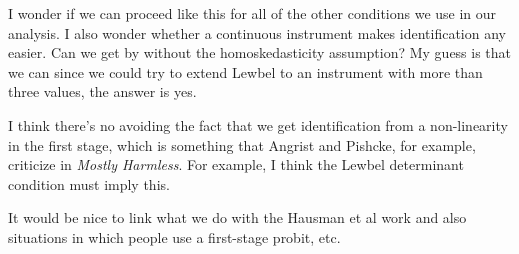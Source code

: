 I wonder if we can proceed like this for all of the other conditions we use in our analysis. 
I also wonder whether a continuous instrument makes identification any easier.
Can we get by without the homoskedasticity assumption?
My guess is that we can since we could try to extend Lewbel to an instrument with more than three values, the answer is yes.

I think there's no avoiding the fact that we get identification from a non-linearity in the first stage, which is something that Angrist and Pishcke, for example, criticize in \emph{Mostly Harmless}.
For example, I think the Lewbel determinant condition must imply this.

It would be nice to link what we do with the Hausman et al work and also situations in which people use a first-stage probit, etc.
